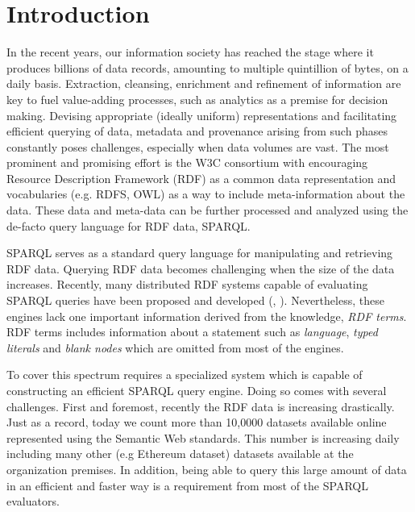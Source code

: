 
\section{Introduction}
\label{sec:intro}
In the recent years, our information society has reached the stage where it produces billions of data records, amounting to multiple quintillion of bytes, on a daily basis.
Extraction, cleansing, enrichment and refinement of information are key to fuel value-adding processes, such as analytics as a premise for decision making.
Devising appropriate (ideally uniform) representations and facilitating efficient querying of data, metadata and provenance arising from such phases constantly poses challenges, especially when data volumes are vast. %
The most prominent and promising effort is the W3C consortium with encouraging Resource Description Framework (RDF) as a common data representation and vocabularies (e.g. RDFS, OWL) as a way to include meta-information about the data.
These data and meta-data can be further processed and analyzed using the de-facto query language for RDF data, SPARQL.

SPARQL serves as a standard query language for manipulating and retrieving RDF data.
Querying RDF data becomes challenging when the size of the data increases. 
Recently, many distributed RDF systems capable of evaluating SPARQL queries have been proposed and developed (\cite{Schatzle:2016:SRQ:2977797.2977806}, \cite{sparqlgx-iswc-2016}).
Nevertheless, these engines lack one important information derived from the knowledge, \emph{RDF terms}.
RDF terms includes information about a statement such as \emph{language}, \emph{typed literals} and \emph{blank nodes} which are omitted from most of the engines.

To cover this spectrum requires a specialized system which is capable of constructing an efficient SPARQL query engine. 
Doing so comes with several challenges.
First and foremost, recently the RDF data is increasing drastically.
Just as a record, today we count more than 10,0000 datasets available online represented using the Semantic Web standards.
This number is increasing daily including many other (e.g Ethereum dataset) datasets available at the organization premises.
In addition, being able to query this large amount of data in an efficient and faster way is a requirement from most of the SPARQL evaluators.

